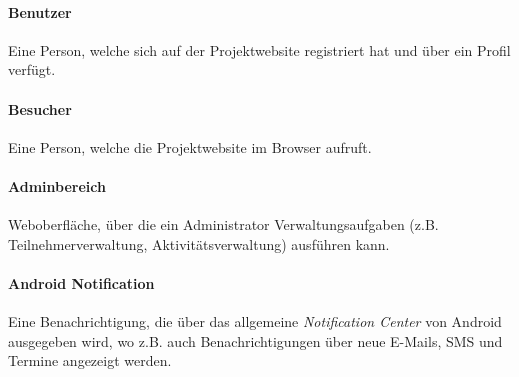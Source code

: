 \documentclass[10pt,a4paper]{article}
\begin{document}
\paragraph{Benutzer} Eine Person, welche sich auf der Projektwebsite registriert hat und über ein Profil verfügt.

\paragraph{Besucher} Eine Person, welche die Projektwebsite im Browser aufruft.

\paragraph{Adminbereich} Weboberfläche, über die ein Administrator Verwaltungsaufgaben (z.B. Teilnehmerverwaltung, Aktivitätsverwaltung) ausführen kann.

\paragraph{Android Notification} Eine Benachrichtigung, die über das allgemeine \emph{Notification Center} von Android ausgegeben wird, wo z.B. auch Benachrichtigungen über neue E-Mails, SMS und Termine angezeigt werden.
\end{document}
